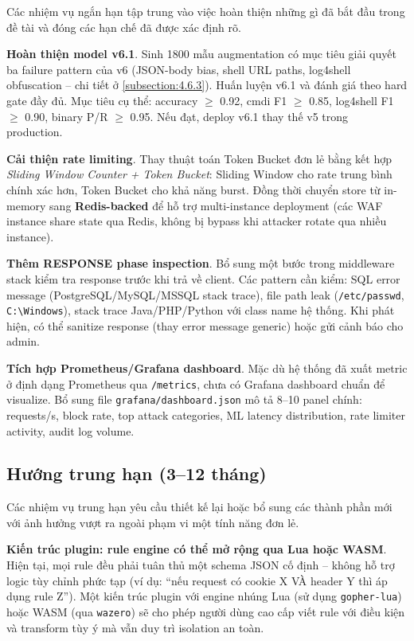 \documentclass[../DoAn.tex]{subfiles}
\begin{document}
Các nhiệm vụ ngắn hạn tập trung vào việc hoàn thiện những gì đã bắt đầu
trong đề tài và đóng các hạn chế đã được xác định rõ.

\textbf{Hoàn thiện model v6.1}. Sinh 1800 mẫu augmentation có mục tiêu
giải quyết ba failure pattern của v6 (JSON-body bias, shell URL paths,
log4shell obfuscation -- chi tiết ở \ref{subsection:4.6.3}). Huấn luyện
v6.1 và đánh giá theo hard gate đầy đủ. Mục tiêu cụ thể: accuracy
\(\ge\) 0.92, cmdi F1 \(\ge\) 0.85, log4shell F1 \(\ge\) 0.90, binary P/R
\(\ge\) 0.95. Nếu đạt, deploy v6.1 thay thế v5 trong production.

\textbf{Cải thiện rate limiting}. Thay thuật toán Token Bucket đơn lẻ
bằng kết hợp \textit{Sliding Window Counter + Token Bucket}: Sliding
Window cho rate trung bình chính xác hơn, Token Bucket cho khả năng burst.
Đồng thời chuyển store từ in-memory sang \textbf{Redis-backed} để hỗ trợ
multi-instance deployment (các WAF instance share state qua Redis, không
bị bypass khi attacker rotate qua nhiều instance).

\textbf{Thêm RESPONSE phase inspection}. Bổ sung một bước trong middleware
stack kiểm tra response trước khi trả về client. Các pattern cần kiểm: SQL
error message (PostgreSQL/MySQL/MSSQL stack trace), file path leak
(\texttt{/etc/passwd}, \texttt{C:\textbackslash Windows}), stack trace
Java/PHP/Python với class name hệ thống. Khi phát hiện, có thể sanitize
response (thay error message generic) hoặc gửi cảnh báo cho admin.

\textbf{Tích hợp Prometheus/Grafana dashboard}. Mặc dù hệ thống đã xuất
metric ở định dạng Prometheus qua \texttt{/metrics}, chưa có Grafana
dashboard chuẩn để visualize. Bổ sung file \texttt{grafana/dashboard.json}
mô tả 8--10 panel chính: requests/s, block rate, top attack categories,
ML latency distribution, rate limiter activity, audit log volume.

\subsection{Hướng trung hạn (3--12 tháng)}
\label{subsection:6.2.2}

Các nhiệm vụ trung hạn yêu cầu thiết kế lại hoặc bổ sung các thành phần
mới với ảnh hưởng vượt ra ngoài phạm vi một tính năng đơn lẻ.

\textbf{Kiến trúc plugin: rule engine có thể mở rộng qua Lua hoặc WASM}.
Hiện tại, mọi rule đều phải tuân thủ một schema JSON cố định -- không
hỗ trợ logic tùy chỉnh phức tạp (ví dụ: ``nếu request có cookie X VÀ
header Y thì áp dụng rule Z''). Một kiến trúc plugin với engine nhúng Lua
(sử dụng \texttt{gopher-lua}) hoặc WASM (qua \texttt{wazero}) sẽ cho phép
người dùng cao cấp viết rule với điều kiện và transform tùy ý mà vẫn duy
trì isolation an toàn.
\end{document}
